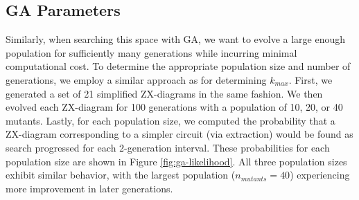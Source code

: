 \subsection*{GA Parameters}

Similarly, when searching this space with GA, we want to evolve a large enough population for sufficiently many generations while incurring minimal computational cost.
To determine the appropriate population size and number of generations, we employ a similar approach as for determining $k_{max}$.
First, we generated a set of 21 simplified ZX-diagrams in the same fashion.
We then evolved each ZX-diagram for 100 generations with a population of 10, 20, or 40 mutants.
Lastly, for each population size, we computed the probability that a ZX-diagram corresponding to a simpler circuit (via extraction) would be found as search progressed for each 2-generation interval.
These probabilities for each population size are shown in Figure \ref{fig:ga-likelihood}.
All three population sizes exhibit similar behavior, with the largest population ($n_{mutants} = 40$) experiencing more improvement in later generations.


